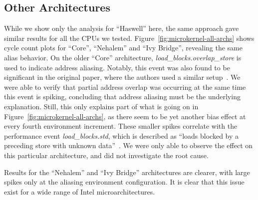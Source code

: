 \documentclass[10pt, conference, compsocconf]{IEEEtran}
\begin{document}
\subsection{Other Architectures}
While we show only the analysis for ``Haswell'' here, the same approach gave similar results for all the CPUs we tested.
Figure~\ref{fig:microkernel-all-archs} shows cycle count plots for ``Core'', ``Nehalem'' and ``Ivy Bridge'', revealing the same alias behavior.%
On the older ``Core'' architecture, \emph{load\_blocks.overlap\_store} is used to indicate address aliasing.
Notably, this event was also found to be significant in the original paper, where the authors used a similar setup~\cite{Mytkowicz:2009:WrongData}.
We were able to verify that partial address overlap was occurring at the same time this event is spiking, concluding that address aliasing must be the underlying explanation.
Still, this only explains part of what is going on in Figure~\ref{fig:microkernel-all-archs}, as there seem to be yet another bias effect at every fourth environment increment.
These smaller spikes correlate with the performance event \emph{load\_blocks.std}, which is described as ``loads blocked by a preceding store with unknown data''~\cite[Table 19-17]{Volume3B}.
We were only able to observe the effect on this particular architecture, and did not investigate the root cause.%

Results for the ``Nehalem'' and ``Ivy Bridge'' architectures are clearer, with large spikes only at the aliasing environment configuration.
It is clear that this issue exist for a wide range of Intel microarchitectures.

\end{document}
